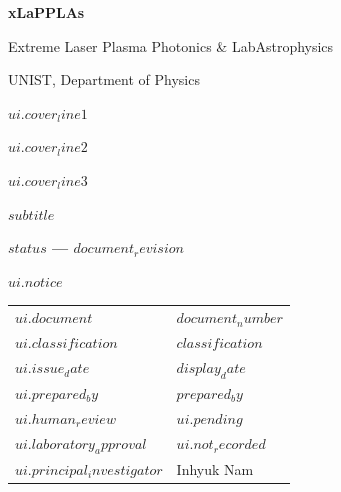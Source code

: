 \documentclass{xlapplas-doc-review}
\begin{document}
\begin{titlepage}
\thispagestyle{empty}
{\fontsize{16}{19}\selectfont\bfseries xLaPPLAs\par}
Extreme Laser Plasma Photonics \& LabAstrophysics\par
UNIST, Department of Physics\par
\vspace{21mm}
{\fontsize{30}{34}\selectfont\bfseries $ui.cover_line1$\par $ui.cover_line2$\par $ui.cover_line3$\par}
\vspace{8.4mm}
{\fontsize{11.5}{15}\selectfont $subtitle$\par}
\vspace{12.6mm}
\textbf{$status$ --- $document_revision$}\par
$ui.notice$
\vfill
\begin{tabular}{@{}p{53.33mm}p{111.67mm}@{}}
$ui.document$ & \texttt{$document_number$} \\
$ui.classification$ & $classification$ \\
$ui.issue_date$ & $display_date$ \\
$ui.prepared_by$ & $prepared_by$ \\
$ui.human_review$ & $ui.pending$ \\
$ui.laboratory_approval$ & $ui.not_recorded$ \\
$ui.principal_investigator$ & Inhyuk Nam \\
\end{tabular}
\vspace{8.4mm}
\end{titlepage}
\thispagestyle{empty}
\end{document}
